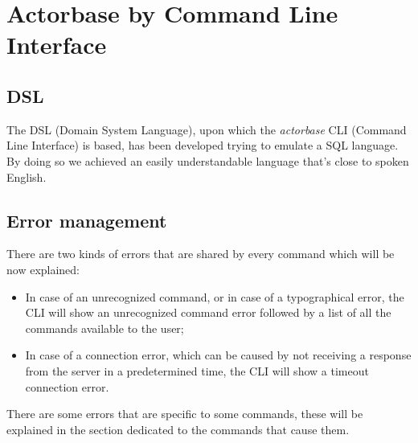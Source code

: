 \documentclass{scalatekids-article}
\begin{document}


\section{Actorbase by Command Line Interface}

\subsection{DSL} %

The DSL (Domain System Language), upon which the \textit{actorbase} CLI (Command
Line Interface) is based, has been developed trying to emulate a SQL language.
By doing so we achieved an easily understandable language that's close to spoken
English.

\subsection{Error management}

There are two kinds of errors that are shared by every command which will be
now explained:
\begin{itemize}
\item In case of an unrecognized command, or in case of a typographical error,
  the CLI will show an unrecognized command error followed by a list of all
  the commands available to the user;
\item In case of a connection error, which can be caused by not receiving a
  response from the server in a predetermined time, the CLI will show a
  timeout connection error.
\end{itemize}
There are some errors that are specific to some commands, these will be explained
in the section dedicated to the commands that cause them.

\end{document}
